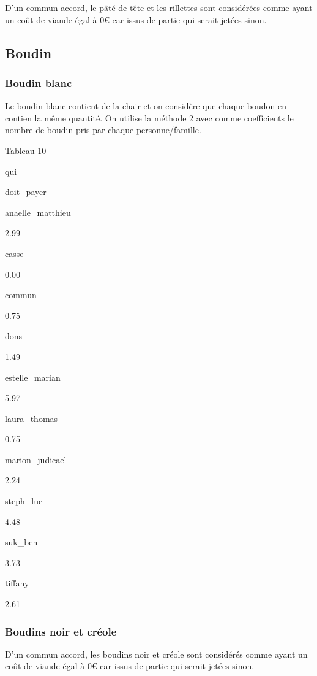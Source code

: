 \documentclass[]{article}
\begin{document}
D'un commun accord, le pâté de tête et les rillettes sont considérées
comme ayant un coût de viande égal à 0€ car issus de partie qui serait
jetées sinon.

\hypertarget{boudin}{%
\subsection{Boudin}\label{boudin}}

\hypertarget{boudin-blanc}{%
\subsubsection{Boudin blanc}\label{boudin-blanc}}

Le boudin blanc contient de la chair et on considère que chaque boudon
en contien la même quantité. On utilise la méthode 2 avec comme
coefficients le nombre de boudin pris par chaque personne/famille.

Tableau 10

qui

doit\_payer

anaelle\_matthieu

2.99

casse

0.00

commun

0.75

dons

1.49

estelle\_marian

5.97

laura\_thomas

0.75

marion\_judicael

2.24

steph\_luc

4.48

suk\_ben

3.73

tiffany

2.61

\hypertarget{boudins-noir-et-creole}{%
\subsubsection{Boudins noir et créole}\label{boudins-noir-et-creole}}

D'un commun accord, les boudins noir et créole sont considérés comme
ayant un coût de viande égal à 0€ car issus de partie qui serait jetées
sinon.
\end{document}
